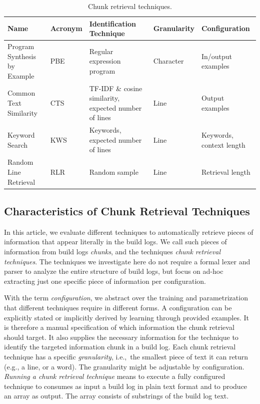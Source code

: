 \begin{table}[htbp]
\centering
\caption{Chunk retrieval techniques.}
\begin{tabularx}{\textwidth}{@{}llXll@{}}
\toprule
Name			     & Acronym & Identification Technique
& Granularity & Configuration \\
\midrule
Program Synthesis by Example & PBE     & Regular expression program
& Character   & In/output examples	\\
Common Text Similarity	     & CTS     & TF-IDF \& cosine similarity,
expected number of lines & Line        & Output examples	   \\
Keyword Search		     & KWS     & Keywords, expected number of
lines			 & Line        & Keywords, context length  \\
Random Line Retrieval	     & RLR     & Random sample
& Line	      & Retrieval length	  \\
\bottomrule
\end{tabularx}
\label{tab:ctr}
\end{table}

\subsection{Characteristics of Chunk Retrieval Techniques}
\label{sec:crt-characteristics}
In this article, we evaluate different techniques to automatically
retrieve pieces of information that appear literally in the build
logs.
We call such pieces of information from build logs
\emph{chunks}, and the techniques \emph{chunk retrieval techniques}.
The techniques we investigate here do not require a formal lexer and
parser to analyze the entire structure of build logs, but focus on
ad-hoc extracting just one specific piece of information per
configuration.

With the term \textit{configuration}, we abstract over the training
and parametrization that different techniques require in different
forms.
A configuration can be explicitly stated or implicitly derived
by learning through provided examples.
It is therefore a manual
specification of which information the chunk retrieval should target.
It also supplies the necessary information for the technique to
identify the targeted information chunk in a build log.
Each chunk
retrieval technique has a specific \textit{granularity}, i.e.,\ the
smallest piece of text it can return (e.g., a line, or a word).
The
granularity might be adjustable by configuration.
\emph{Running a
chunk retrieval technique} means to execute a fully configured
technique to consumes as input a build log in plain text format and to
produce an array as output.
The array consists of substrings of the
build log text.

